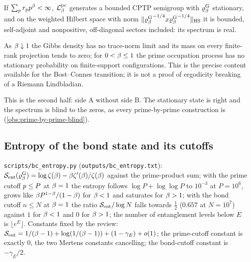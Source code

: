 \begin{proposition}
\label{prop:prime-chain-offdiagonal}
If $\sum_{p}r_{p}p^{\beta}<\infty$, $\mathcal L^{\mathrm{pc}}_{\beta}$ generates a bounded CPTP
semigroup with $\varrho^{\mathrm{G}}_{\beta}$ stationary, and on the weighted Hilbert space with norm
$\|{\varrho^{\mathrm{G}}_{\beta}}^{-1/4}x{\varrho^{\mathrm{G}}_{\beta}}^{-1/4}\|_{\mathrm{HS}}$ it is bounded,
self-adjoint and nonpositive, off-diagonal sectors included: its spectrum is real.
\end{proposition}

\begin{corollary}
\label{cor:gibbs-delocalisation}
As $\beta\downarrow1$ the Gibbs density has no trace-norm limit and its mass on every
finite-rank projection tends to zero; for $0<\beta\le1$ the prime occupation process
has no stationary probability on finite-support configurations. This is the precise
content available for the Bost--Connes transition; it is not a proof of ergodicity
breaking of a Riemann Lindbladian.
\end{corollary}

This is the second half: side A without side B. The stationary state is right and the
spectrum is blind to the zeros, as every prime-by-prime construction is
(\cref{obs:prime-by-prime-blind}).

\subsection{Entropy of the bond state and its cutoffs}

\begin{numerical}
\label{num:bc-entropy}
\texttt{scripts/bc\_entropy.py} (\texttt{outputs/bc\_entropy.txt}): $\mathcal S_{\mathrm{ent}}(\varrho^{\mathrm{G}}_{\beta})
= \log\zeta(\beta) - \beta\zeta'(\beta)/\zeta(\beta)$ against the prime-product
sum; with the prime cutoff $p\le P$ at $\beta=1$ the entropy follows $\log P +
\log\log P$ to $10^{-3}$ at $P=10^6$, grows like $\beta P^{1-\beta}/(1-\beta)$
for $\beta<1$ and saturates for $\beta>1$; with the bond cutoff $n\le N$ at
$\beta=1$ the ratio $\mathcal S_{\mathrm{ent}}/\log N$ falls towards $\tfrac12$ ($0.657$ at $N=10^7$)
against $1$ for $\beta<1$ and $0$ for $\beta>1$; the number of entanglement levels
below $E$ is $\lfloor e^E\rfloor$. Constants fixed by the review: $\mathcal S_{\mathrm{ent}} = 1/(\beta-1)
+ \log(1/(\beta-1)) + (1-\gamma_E) + o(1)$; the prime-cutoff constant is exactly $0$,
the two Mertens constants cancelling; the bond-cutoff constant is $-\gamma_E/2$.
\end{numerical}

